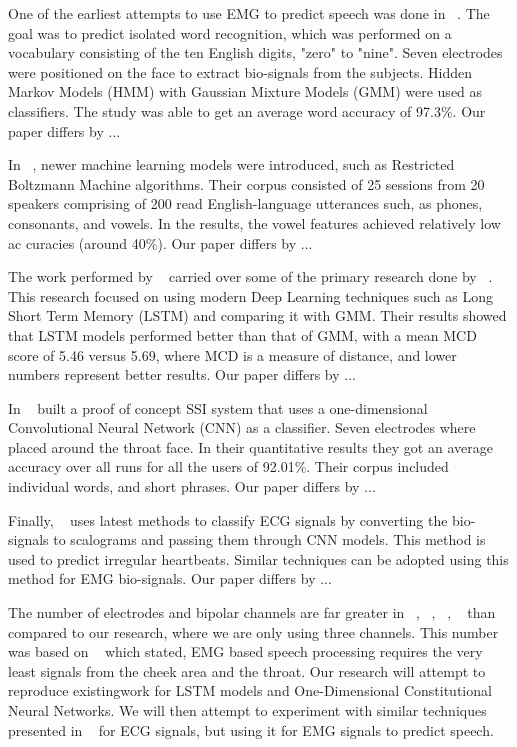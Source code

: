 \documentclass[conference]{IEEEtran}
\begin{document}
One of the earliest attempts to use EMG to predict speech was done in
~\cite{maier-hein_session_2005}. The goal was to predict isolated word recognition,
which was performed on a vocabulary consisting of the ten English digits, "zero" to
"nine". Seven electrodes were positioned on the face to extract bio-signals from the
subjects. Hidden Markov Models (HMM) with Gaussian Mixture Models (GMM)  were used as
classifiers. The study was able to get an average word accuracy of 97.3\%. Our paper 
differs by ...

In ~\cite{wand_pattern_2014}, newer machine learning models were introduced, such as
Restricted Boltzmann Machine algorithms. Their corpus consisted of 25 sessions from
20 speakers comprising of 200 read English-language utterances such, as phones,
consonants, and vowels. In the results, the vowel features achieved relatively low
ac curacies (around 40\%). Our paper differs by ...

The work performed by ~\cite{janke_emg--speech:_2017} carried over some of the primary
research done by ~\cite{wand_pattern_2014}. This research focused on using modern
Deep Learning techniques such as Long Short Term Memory (LSTM) and comparing it with
GMM. Their results showed that LSTM models performed better than that of GMM, with a
mean MCD score of 5.46 versus 5.69, where MCD is a measure of distance, and lower numbers
represent better results. Our paper differs by ...

In ~\cite{kapur_alterego:_2018} built a proof of concept SSI system that uses
a one-dimensional Convolutional Neural Network (CNN) as a classifier. Seven electrodes
where placed around the throat face. In their quantitative results they got an average accuracy over
all runs for all the users of 92.01\%. Their corpus included individual words, and short
phrases. Our paper differs by ...

Finally, ~\cite{noauthor_classify_nodate} uses latest methods to classify ECG signals by
converting the bio-signals to scalograms and passing them through CNN models. This method is used
to predict irregular heartbeats. Similar techniques can be adopted using this method for EMG
bio-signals. Our paper differs by ...

The number of electrodes and bipolar channels are far greater in ~\cite{kapur_alterego:_2018},
~\cite{wand_pattern_2014}, ~\cite{janke_emg--speech:_2017}, ~\cite{maier-hein_session_2005} than 
compared to our research, where we are only using three channels. This number was based on 
~\cite{maier-hein_session_2005} which stated, EMG based speech processing requires the very 
least signals from the cheek area and the throat. Our research will attempt to reproduce existingwork 
for LSTM models and One-Dimensional Constitutional Neural Networks. We will then attempt to 
experiment with similar techniques presented in ~\cite{noauthor_classify_nodate} for ECG signals, 
but using it for EMG signals to predict speech.
\end{document}
